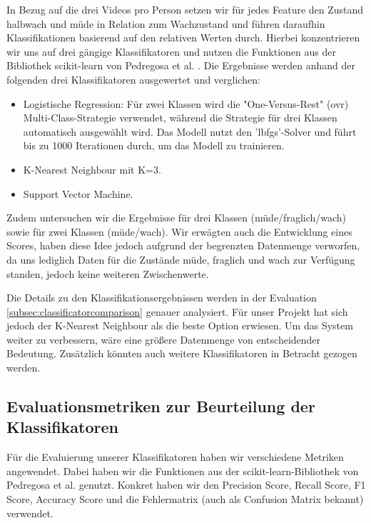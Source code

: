 In Bezug auf die drei Videos pro Person setzen wir für jedes Feature den Zustand halbwach und müde in Relation zum Wachzustand und führen daraufhin Klassifikationen basierend auf den relativen Werten durch. Hierbei konzentrieren wir uns auf drei gängige Klassifikatoren und nutzen die Funktionen aus der Bibliothek scikit-learn von Pedregosa et al. \cite{PE11}. Die Ergebnisse werden anhand der folgenden drei Klassifikatoren ausgewertet und verglichen:

\begin{itemize}
\item Logistische Regression: Für zwei Klassen wird die "One-Versus-Rest" (ovr) Multi-Class-Strategie verwendet, während die Strategie für drei Klassen automatisch ausgewählt wird. Das Modell nutzt den 'lbfgs'-Solver und führt bis zu 1000 Iterationen durch, um das Modell zu trainieren.
\item K-Nearest Neighbour mit K=3.
\item Support Vector Machine.
\end{itemize}

Zudem untersuchen wir die Ergebnisse für drei Klassen (müde/fraglich/wach) sowie für zwei Klassen (müde/wach). Wir erwägten auch die Entwicklung eines Scores, haben diese Idee jedoch aufgrund der begrenzten Datenmenge verworfen, da uns lediglich Daten für die Zustände müde, fraglich und wach zur Verfügung standen, jedoch keine weiteren Zwischenwerte.

Die Details zu den Klassifikationsergebnissen werden in der Evaluation \ref{subsec:classificatorcomparison} genauer analysiert. Für unser Projekt hat sich jedoch der K-Nearest Neighbour als die beste Option erwiesen. Um das System weiter zu verbessern, wäre eine größere Datenmenge von entscheidender Bedeutung. Zusätzlich könnten auch weitere Klassifikatoren in Betracht gezogen werden.

\subsection{Evaluationsmetriken zur Beurteilung der Klassifikatoren}
\label{sec:classificationmetrics}

Für die Evaluierung unserer Klassifikatoren haben wir verschiedene Metriken angewendet. Dabei haben wir die Funktionen aus der scikit-learn-Bibliothek von Pedregosa et al. \cite{PE11} genutzt. Konkret haben wir den Precision Score, Recall Score, F1 Score, Accuracy Score und die Fehlermatrix (auch als Confusion Matrix bekannt) verwendet.

